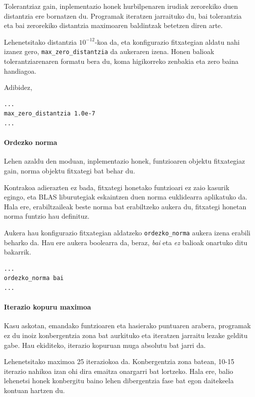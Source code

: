 \documentclass[10pt,a4paper,basque]{article}
\begin{document}
Tolerantziaz gain, inplementazio honek hurbilpenaren irudiak zerorekiko duen distantzia ere bornatzen du. Programak iteratzen jarraituko du, bai tolerantzia eta bai zerorekiko distantzia maximoaren baldintzak betetzen diren arte.

Lehenetsitako distantzia $10^{-12}$-koa da, eta konfigurazio fitxategian aldatu nahi izanez gero, \verb|max_zero_distantzia| da aukeraren izena. Honen balioak tolerantziarenaren formatu bera du, koma higikorreko zenbakia eta zero baina handiagoa.

Adibidez,

\begin{lstlisting}
...
max_zero_distantzia 1.0e-7
...
\end{lstlisting}

\paragraph{Ordezko norma}

Lehen azaldu den moduan, inplementazio honek, funtzioaren objektu fitxategiaz gain, norma objektu fitxategi bat behar du.

Kontrakoa adierazten ez bada, fitxategi honetako funtzioari ez zaio kasurik egingo, eta BLAS liburutegiak eskaintzen duen norma euklidearra aplikatuko da. Hala ere, erabiltzaileak beste norma bat erabiltzeko aukera du, fitxategi honetan norma funtzio hau definituz.

Aukera hau konfigurazio fitxategian aldatzeko \verb|ordezko_norma| aukera izena erabili beharko da. Hau ere aukera boolearra da, beraz, \emph{bai} eta \emph{ez} balioak onartuko ditu bakarrik.

\begin{lstlisting}
...
ordezko_norma bai
...
\end{lstlisting}

\paragraph{Iterazio kopuru maximoa}
Kasu askotan, emandako funtzioaren eta hasierako puntuaren arabera, programak ez du inoiz konbergentzia zona bat aurkituko eta iteratzen jarraitu lezake gelditu gabe. Hau ekiditeko, iterazio kopuruan muga absolutu bat jarri da.

Lehenetsitako maximoa 25 iteraziokoa da. Konbergentzia zona batean, 10-15 iterazio nahikoa izan ohi dira emaitza onargarri bat lortzeko. Hala ere, balio lehenetsi honek konbergitu baino lehen dibergentzia fase bat egon daitekeela kontuan hartzen du.
\end{document}
